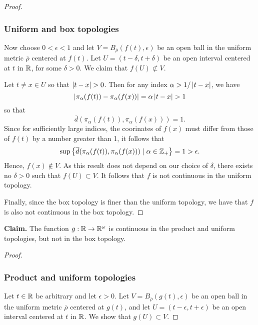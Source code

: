 \begin{solution}
\begin{proof}
        \subsubsection*{Uniform and box topologies}
        Now choose $0 < \epsilon < 1$ and let $V = B_{\overline{\rho}}(f(t), \epsilon)$ be an open ball in the uniform metric $\overline{\rho}$ centered at $f(t)$.
        Let $U = (t - \delta, t + \delta)$ be an open interval centered at $t$ in $\mathbb{R}$, for some $\delta > 0$.
        We claim that $f(U) \not\subset V$.

        Let $t \neq x \in U$ so that $\left| t - x \right| > 0$.
        Then for any index $\alpha > 1 / \left| t - x \right|$, we have
        \begin{equation*}
          \left| \pi_\alpha(f(t)) - \pi_\alpha(f(x)) \right| = \alpha \left| t - x \right| > 1
        \end{equation*}
        so that 
        \begin{equation*}
          \overline{d}(\pi_\alpha(f(t)), \pi_\alpha(f(x))) = 1.
        \end{equation*}
        Since for sufficiently large indices, the coorinates of $f(x)$ must differ from those of $f(t)$ by a number greater than 1, it follows that
        \begin{equation*}
          \sup\left\{\overline{d}(\pi_\alpha(f(t)), \pi_\alpha(f(x))) \mid \alpha \in \mathbb{Z}_+\right\} = 1 > \epsilon.
        \end{equation*}
        Hence, $f(x) \not\in  V$.
        As this result does not depend on our choice of $\delta$, there exists no $\delta > 0$ such that $f(U) \subset V$.
        It follows that $f$ is not continuous in the uniform topology.

        Finally, since the box topology is finer than the uniform topology, we have that $f$ is also not continuous in the box topology.
    \end{proof}
    \bigskip

    \noindent\textbf{Claim.} The function $g: \mathbb{R} \rightarrow \mathbb{R}^\omega$ is continuous in the product and uniform topologies, but not in the box topology.
    \begin{proof}~

        \subsubsection*{Product and uniform topologies}
        Let $t \in \mathbb{R}$ be arbitrary and let $\epsilon > 0$.
        Let $V = B_{\overline{\rho}}(g(t), \epsilon)$ be an open ball in the uniform metric $\overline{\rho}$ centered at $g(t)$, and let $U = (t - \epsilon, t + \epsilon)$ be an open interval centered at $t$ in $\mathbb{R}$.
        We show that $g(U) \subset V$.


\end{proof}
\end{solution}
